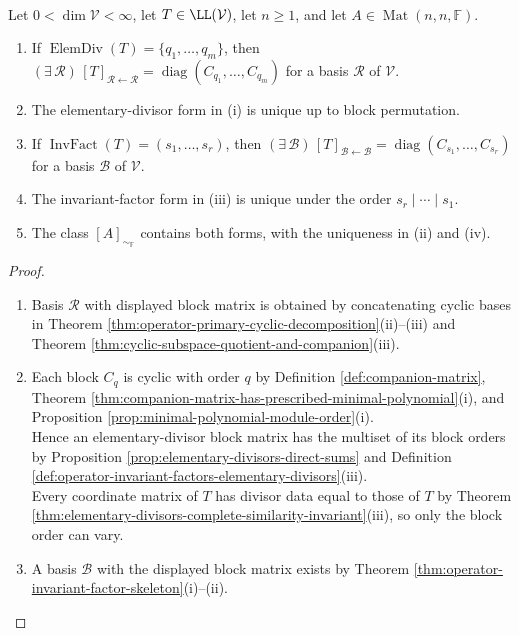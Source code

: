 \begin{theorem} \label{thm:rational-canonical-form-elementary-and-invariant-versions} \\
Let $0<\dim\mathcal{V}<\infty$, let $T\in\LL(\mathcal{V})$, let $n\geq1$, and let $A\in\operatorname{Mat}(n,n,\mathbb{F})$.
\begin{enumerate}[label=(\roman*)]
\setlength{\itemsep}{0pt}
\item If $\operatorname{ElemDiv}(T)=\{q_1,\ldots,q_m\}$, then $(\exists\,\mathcal{R})\,[T]_{\mathcal{R}\leftarrow\mathcal{R}}=\operatorname{diag}(C_{q_1},\ldots,C_{q_m})$ for a basis $\mathcal{R}$ of $\mathcal{V}$.
\item The elementary-divisor form in (i) is unique up to block permutation.
\item If $\operatorname{InvFact}(T)=(s_1,\ldots,s_r)$, then $(\exists\,\mathcal{B})\,[T]_{\mathcal{B}\leftarrow\mathcal{B}}=\operatorname{diag}(C_{s_1},\ldots,C_{s_r})$ for a basis $\mathcal{B}$ of $\mathcal{V}$.
\item The invariant-factor form in (iii) is unique under the order $s_r\mid\cdots\mid s_1$.
\item The class $[A]_{\sim_{\mathbb{F}}}$ contains both forms, with the uniqueness in (ii) and (iv).
\end{enumerate}
\begin{proof}
\begin{enumerate}[label=(\roman*)]
\setlength{\itemsep}{0pt}
\item Basis $\mathcal{R}$ with displayed block matrix is obtained by concatenating cyclic bases in Theorem \ref{thm:operator-primary-cyclic-decomposition}(ii)--(iii) and Theorem \ref{thm:cyclic-subspace-quotient-and-companion}(iii).
\item Each block $C_q$ is cyclic with order $q$ by Definition \ref{def:companion-matrix}, Theorem \ref{thm:companion-matrix-has-prescribed-minimal-polynomial}(i), and Proposition \ref{prop:minimal-polynomial-module-order}(i).\\
Hence an elementary-divisor block matrix has the multiset of its block orders by Proposition \ref{prop:elementary-divisors-direct-sums} and Definition \ref{def:operator-invariant-factors-elementary-divisors}(iii).\\
Every coordinate matrix of $T$ has divisor data equal to those of $T$ by Theorem \ref{thm:elementary-divisors-complete-similarity-invariant}(iii), so only the block order can vary.
\item A basis $\mathcal{B}$ with the displayed block matrix exists by Theorem \ref{thm:operator-invariant-factor-skeleton}(i)--(ii).

\end{enumerate}
\end{proof}
\end{theorem}
